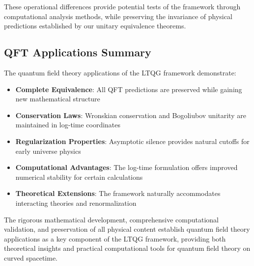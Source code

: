 These operational differences provide potential tests of the framework through computational analysis methods, while preserving the invariance of physical predictions established by our unitary equivalence theorems.

\subsection{QFT Applications Summary}

The quantum field theory applications of the LTQG framework demonstrate:

\begin{itemize}
\item \textbf{Complete Equivalence}: All QFT predictions are preserved while gaining new mathematical structure
\item \textbf{Conservation Laws}: Wronskian conservation and Bogoliubov unitarity are maintained in log-time coordinates
\item \textbf{Regularization Properties}: Asymptotic silence provides natural cutoffs for early universe physics
\item \textbf{Computational Advantages}: The log-time formulation offers improved numerical stability for certain calculations
\item \textbf{Theoretical Extensions}: The framework naturally accommodates interacting theories and renormalization
\end{itemize}

The rigorous mathematical development, comprehensive computational validation, and preservation of all physical content establish quantum field theory applications as a key component of the LTQG framework, providing both theoretical insights and practical computational tools for quantum field theory on curved spacetime.